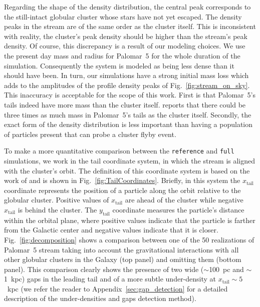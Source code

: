 \documentclass{aa}
\begin{document}
    Regarding the shape of the density distribution, the central peak corresponds to the still-intact globular cluster whose stars have not yet escaped. The density peaks in the stream are of the same order as the cluster itself. This is inconsistent with reality, the cluster's peak density should be higher than the stream's peak density. Of course, this discrepancy is a result of our modeling choices. We use the present day mass and radius for Palomar~5 for the whole duration of the simulation. Consequently the system is modeled as being less dense than it should have been. In turn, our simulations have a strong initial mass loss which adds to the amplitudes of the profile density peaks of Fig.~\ref{fig:stream_on_sky}. This inaccuracy is acceptable for the scope of this work. First is that Palomar~5's tails indeed have more mass than the cluster itself. \citet{2017ApJ...842..120I} reports that there could be three times as much mass in Palomar~5's tails as the cluster itself. Secondly, the exact form of the density distribution is less important than having a population of particles present that can probe a cluster flyby event.
    
    To make a more quantitative comparison between the \texttt{reference} and \texttt{full} simulations, we work in the tail coordinate system, in which the stream is aligned with the cluster's orbit. The definition of this coordinate system is based on the work of \citet{2004AJ....127.2753D} and is shown in Fig.~\ref{fig:TailCoordinates}. Briefly, in this system the $x_{\textrm{tail}}$ coordinate represents the position of a particle along the orbit relative to the globular cluster. Positive values of $x_{\textrm{tail}}$ are ahead of the cluster while negative $x_{\textrm{tail}}$ is behind the cluster. The $y_{\textrm{tail}}$ coordinate measures the particle's distance within the orbital plane, where positive values indicate that the particle is farther from the Galactic center and negative values indicate that it is closer. Fig.~\ref{fig:decomposition} shows a comparison between one of the 50 realizations of Palomar~5 stream taking into account the gravitational interactions with all other globular clusters in the Galaxy (top panel) and omitting them (bottom panel). This comparison clearly shows the presence of two wide ($\sim$100~pc and $\sim$1~kpc) gaps in the leading tail and of a more subtle under-density at $x_{\textrm{tail}}\sim 5$~kpc (we refer the reader to Appendix~\ref{sec:gap_detection} for a detailed description of the under-densities and gaps detection method). 
    
\end{document}
